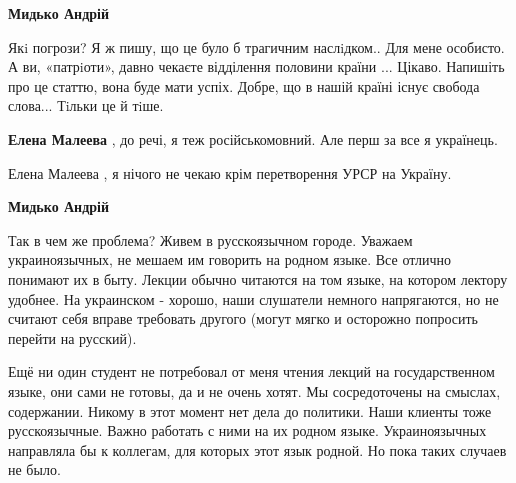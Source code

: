 \begin{itemize}
\begin{itemize}
 
\textbf{Мидько Андрій} 

Якi погрози? Я ж пишу, що це було б трагичним наслiдком.. Для мене особисто. А
ви, «патрiоти», давно чекаєте відділення половини країни ... Цікаво. Напишіть
про це статтю, вона буде мати успіх. Добре, що в нашій країні існує свобода
слова... Тiльки це й тiше.

 
\textbf{Елена Малеева} , до речі, я теж російськомовний. Але перш за все я українець.

 
Елена Малеева , я нічого не чекаю крім перетворення УРСР на Україну.

 
\textbf{Мидько Андрій} 

Так в чем же проблема? Живем в русскоязычном городе. Уважаем украиноязычных, не
мешаем им говорить на родном языке. Все отлично понимают их в быту. Лекции
обычно читаются на том языке, на котором лектору удобнее. На украинском -
хорошо, наши слушатели немного напрягаются, но не считают себя вправе требовать
другого (могут мягко и осторожно попросить перейти на русский). 

Ещё ни один студент не потребовал от меня чтения лекций на государственном
языке, они сами не готовы, да и не очень хотят. Мы сосредоточены на смыслах,
содержании. Никому в этот момент нет дела до политики. Наши клиенты тоже
русскоязычные. Важно работать с ними на их родном языке. Украиноязычных
направляла бы к коллегам, для которых этот язык родной. Но пока таких случаев
не было. 


\end{itemize}
\end{itemize}
